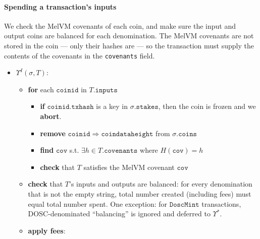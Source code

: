 \documentclass[
]{article}
\newcommand{\passthrough}[1]{#1}
\providecommand{\tightlist}{%
  \setlength{\itemsep}{0pt}\setlength{\parskip}{0pt}}
\begin{document}
\hypertarget{spending-a-transactions-inputs}{%
  \paragraph{Spending a transaction's
    inputs}\label{spending-a-transactions-inputs}}

We check the MelVM covenants of each coin, and make sure the input and
output coins are balanced for each denomination. The MelVM covenants are
not stored in the coin --- only their hashes are --- so the transaction
must supply the contents of the covenants in the
\passthrough{\lstinline!covenants!} field.

\begin{itemize}
  \tightlist
  \item
        \(\Upsilon^I(\sigma, T)\):

        \begin{itemize}
          \tightlist
          \item
                \textbf{for} each \(\mathtt{coinid}\) in \(T.\mathtt{inputs}\)

                \begin{itemize}
                  \tightlist
                  \item
                        \textbf{if} \(\mathtt{coinid.txhash}\) is a key in
                        \(\sigma.\mathtt{stakes}\), then the coin is frozen and we
                        \textbf{abort}.
                  \item
                        \textbf{remove}
                        \(\mathtt{coinid} \Rightarrow \mathtt{coindataheight}\) from
                        \(\sigma.\mathtt{coins}\)
                  \item
                        \textbf{find} \(\mathtt{cov}\) s.t.
                        \(\exists h \in T.\mathtt{covenants}\) where
                        \(H(\mathtt{cov}) = h\)
                  \item
                        \textbf{check} that \(T\) satisfies the MelVM covenant
                        \(\mathtt{cov}\)
                \end{itemize}
          \item
                \textbf{check} that \(T\)'s inputs and outputs are balanced: for
                every denomination that is not the empty string, total number
                created (including fees) must equal total number spent. One
                exception: for \(\mathtt{DoscMint}\) transactions, DOSC-denominated
                ``balancing'' is ignored and deferred to \(\Upsilon^*\).
          \item
                \textbf{apply fees}:


\end{itemize}
\end{itemize}
\end{document}
